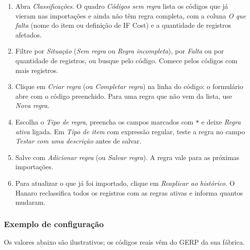 \begin{enumerate}[leftmargin=1.6em,itemsep=0.2em,topsep=0.3em]
\item Abra \emph{Classificações}. O quadro \emph{Códigos sem regra} lista os códigos que já vieram nas importações e ainda não têm regra completa, com a coluna \emph{O que falta} (nome do item ou definição de IF Cost) e a quantidade de registros afetados.
\item Filtre por \emph{Situação} (\emph{Sem regra} ou \emph{Regra incompleta}), por \emph{Falta} ou por quantidade de registros, ou busque pelo código. Comece pelos códigos com mais registros.
\item Clique em \emph{Criar regra} (ou \emph{Completar regra}) na linha do código: o formulário abre com o código preenchido. Para uma regra que não vem da lista, use \emph{Nova regra}.
\item Escolha o \emph{Tipo de regra}, preencha os campos marcados com \texttt{*} e deixe \emph{Regra ativa} ligada. Em \emph{Tipo de item} com expressão regular, teste a regra no campo \emph{Testar com uma descrição} antes de salvar.
\item Salve com \emph{Adicionar regra} (ou \emph{Salvar regra}). A regra vale para as próximas importações.
\item Para atualizar o que já foi importado, clique em \emph{Reaplicar ao histórico}. O Hanaro reclassifica todos os registros com as regras ativas e informa quantos mudaram.
\end{enumerate}

\subsubsection*{Exemplo de configuração}

Os valores abaixo são ilustrativos; os códigos reais vêm do GERP da sua fábrica.

